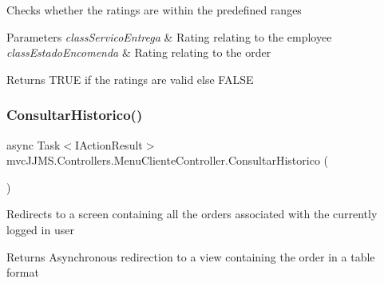 Checks whether the ratings are within the predefined ranges 


\begin{DoxyParams}{Parameters}
{\em class\+Servico\+Entrega} & Rating relating to the employee\\
\hline
{\em class\+Estado\+Encomenda} & Rating relating to the order\\
\hline
\end{DoxyParams}
\begin{DoxyReturn}{Returns}
T\+R\+UE if the ratings are valid else F\+A\+L\+SE
\end{DoxyReturn}
\mbox{\label{classmvc_j_j_m_s_1_1_controllers_1_1_menu_cliente_controller_a6aadfeccdbb52ae6a555b2ee00c4a3f0}} 
\subsubsection{\texorpdfstring{Consultar\+Historico()}{ConsultarHistorico()}}
{\footnotesize\ttfamily async Task$<$I\+Action\+Result$>$ mvc\+J\+J\+M\+S.\+Controllers.\+Menu\+Cliente\+Controller.\+Consultar\+Historico (\begin{DoxyParamCaption}{ }\end{DoxyParamCaption})\hspace{0.3cm}{\ttfamily [inline]}}



Redirects to a screen containing all the orders associated with the currently logged in user 

\begin{DoxyReturn}{Returns}
Asynchronous redirection to a view containing the order in a table format
\end{DoxyReturn}
\mbox{\label{classmvc_j_j_m_s_1_1_controllers_1_1_menu_cliente_controller_abfae9a2d4e35be83a5baf81cb906d41e}} 
